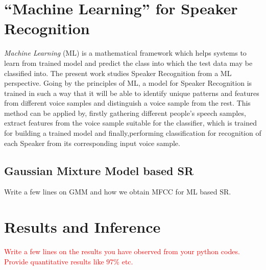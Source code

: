 \documentclass{article}
\begin{document}
\section{\textbf{{``Machine Learning'' for Speaker Recognition}}}
 \textit{Machine Learning} (ML) is a mathematical framework which helps systems to learn from trained model and predict the class into which the test data may be classified into. 
The present work studies Speaker Recognition from a ML perspective. Going by the principles of ML, a model for Speaker Recognition is trained in such a way that it will be able to identify unique patterns and features from different voice samples and distinguish a voice sample from the rest. This method can be applied by, firstly {gathering different people's speech samples}, {extract features from the voice sample} suitable for the classifier, which is {trained for building a trained model} and finally,{performing classification for recognition of each Speaker} from its corresponding input voice sample.

\subsection{Gaussian Mixture Model based SR}
Write a few lines on GMM and how we obtain MFCC for ML based SR.

\section{\textbf{{Results and Inference}}}
\textcolor{red}{Write a few lines on the results you have observed from your python codes. Provide quantitative results like $97\%$ etc.}
\end{document}
